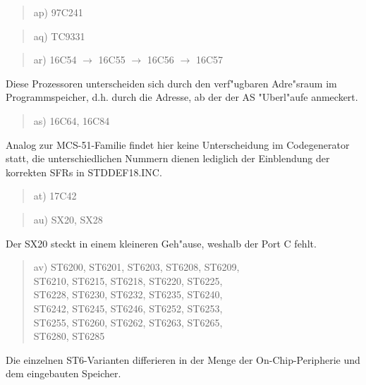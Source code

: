\documentclass[12pt,a4paper,twoside]{report}
\begin{document}
\begin{quote}
ap) 97C241
\end{quote}
\begin{quote}
aq) TC9331
\end{quote}
\begin{quote}
ar) 16C54 $\rightarrow$ 16C55 $\rightarrow$ 16C56 $\rightarrow$ 16C57
\end{quote}
Diese Prozessoren unterscheiden sich durch den verf"ugbaren
Adre"sraum im Programmspeicher, d.h. durch die Adresse, ab der
der AS "Uberl"aufe anmeckert.
\begin{quote}
as) 16C64, 16C84
\end{quote}
Analog zur MCS-51-Familie findet hier keine Unterscheidung im
Codegenerator statt, die unterschiedlichen Nummern dienen lediglich
der Einblendung der korrekten SFRs in STDDEF18.INC.
\begin{quote}
at) 17C42
\end{quote}
\begin{quote}
au) SX20, SX28
\end{quote}
Der SX20 steckt in einem kleineren Geh"ause, weshalb der Port C
fehlt.
\begin{quote}
av) ST6200, ST6201, ST6203, ST6208, ST6209,\\
    ST6210, ST6215, ST6218, ST6220, ST6225,\\
    ST6228, ST6230, ST6232, ST6235, ST6240,\\
    ST6242, ST6245, ST6246, ST6252, ST6253,\\
    ST6255, ST6260, ST6262, ST6263, ST6265,\\
    ST6280, ST6285
\end{quote}
Die einzelnen ST6-Varianten differieren in der Menge der
On-Chip-Peripherie und dem eingebauten Speicher.
\end{document}
